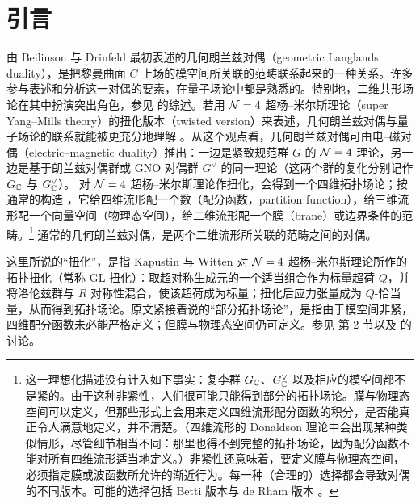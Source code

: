 
\section{引言}\label{intro}


由 Beilinson 与 Drinfeld 最初表述的几何朗兰兹对偶（geometric Langlands duality）\cite{BD}，是把黎曼曲面 $C$ 上场的模空间所关联的范畴联系起来的一种关系。许多参与表述和分析这一对偶的要素，在量子场论中都是熟悉的。特别地，二维共形场论在其中扮演突出角色，参见 \cite{F} 的综述。若用 ${\mathcal N}=4$ 超杨–米尔斯理论（super Yang--Mills theory）的扭化版本（twisted version）来表述，几何朗兰兹对偶与量子场论的联系就能被更充分地理解 \cite{KW}。从这个观点看，几何朗兰兹对偶可由电–磁对偶（electric--magnetic duality）推出：一边是紧致规范群 $G$ 的 ${\mathcal N}=4$ 理论，另一边是基于朗兰兹对偶群或 GNO 对偶群 $G^\vee$ 的同一理论（这两个群的复化分别记作 $G_{\mathbb C}$ 与 $G^\vee_{\mathbb C}$）。 对 ${\mathcal N}=4$ 超杨–米尔斯理论作扭化，会得到一个四维拓扑场论；按通常的构造 \cite{BaDo,L1,Fr}，它给四维流形配一个数（配分函数，partition function），给三维流形配一个向量空间（物理态空间），给二维流形配一个膜（brane）或边界条件的范畴。\footnote{\label{partial}
这一理想化描述没有计入如下事实：复李群 $G_{\mathbb C}$、$G^\vee_{\mathbb C}$ 以及相应的模空间都不是紧的。由于这种非紧性，人们很可能只能得到部分的拓扑场论。膜与物理态空间可以定义，但那些形式上会用来定义四维流形配分函数的积分，是否能真正令人满意地定义，并不清楚。（四维流形的 Donaldson 理论中会出现某种类似情形，尽管细节相当不同：那里也得不到完整的拓扑场论，因为配分函数不能对所有四维流形适当地定义。）非紧性还意味着，要定义膜与物理态空间，必须指定膜或波函数所允许的渐近行为。每一种（合理的）选择都会导致对偶的不同版本。可能的选择包括 Betti 版本与 de Rham 版本 \cite{BN}。}
通常的几何朗兰兹对偶，是两个二维流形所关联的范畴之间的对偶。

\begin{yizhu}
这里所说的“扭化”，是指 Kapustin 与 Witten 对 ${\mathcal N}=4$ 超杨–米尔斯理论所作的拓扑扭化（常称 GL 扭化）：取超对称生成元的一个适当组合作为标量超荷 $Q$，并将洛伦兹群与 $R$ 对称性混合，使该超荷成为标量；扭化后应力张量成为 $Q$-恰当量，从而得到拓扑场论。原文紧接着说的“部分拓扑场论”，是指由于模空间非紧，四维配分函数未必能严格定义；但膜与物理态空间仍可定义。参见 \cite{KW} 第 2 节以及 \cite{GuW} 的讨论。
\end{yizhu}

